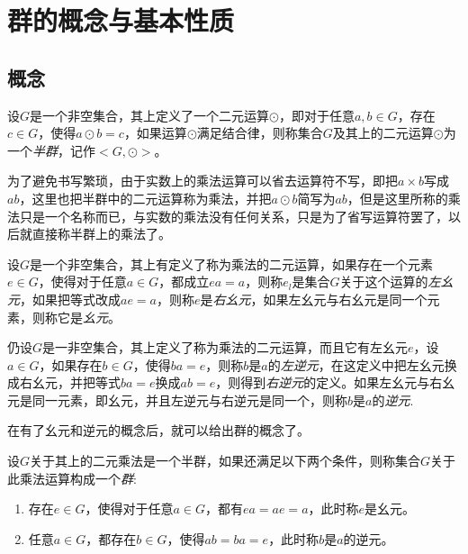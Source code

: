 
\section{群的概念与基本性质}
\label{sec:group}

\subsection{概念}
\label{sec:concept-of-group}



\begin{definition}
  设$G$是一个非空集合，其上定义了一个二元运算$\odot$，即对于任意$a,b \in G$，存在$c \in G$，使得$a\odot b=c$，如果运算$\odot$满足结合律，则称集合$G$及其上的二元运算$\odot$为一个\emph{半群}，记作$<G, \odot>$。
\end{definition}

为了避免书写繁琐，由于实数上的乘法运算可以省去运算符不写，即把$a\times b$写成$ab$，这里也把半群中的二元运算称为乘法，并把$a\odot b$简写为$ab$，但是这里所称的乘法只是一个名称而已，与实数的乘法没有任何关系，只是为了省写运算符罢了，以后就直接称半群上的乘法了。

\begin{definition}
  设$G$是一个非空集合，其上有定义了称为乘法的二元运算，如果存在一个元素$e \in G$，使得对于任意$a \in G$，都成立$ea=a$，则称$e_l$是集合$G$关于这个运算的\emph{左幺元}，如果把等式改成$ae=a$，则称$e$是\emph{右幺元}，如果左幺元与右幺元是同一个元素，则称它是\emph{幺元}。
\end{definition}

\begin{definition}
  仍设$G$是一非空集合，其上定义了称为乘法的二元运算，而且它有左幺元$e$，设$a \in G$，如果存在$b \in G$，使得$ba=e$，则称$b$是$a$的\emph{左逆元}，在这定义中把左幺元换成右幺元，并把等式$ba=e$换成$ab=e$，则得到\emph{右逆元}的定义。如果左幺元与右幺元是同一元素，即幺元，并且左逆元与右逆元是同一个，则称$b$是$a$的\emph{逆元}.
\end{definition}

在有了幺元和逆元的概念后，就可以给出群的概念了。

\begin{definition}
  设$G$关于其上的二元乘法是一个半群，如果还满足以下两个条件，则称集合$G$关于此乘法运算构成一个\emph{群}:
  \begin{enumerate}
  \item 存在$e \in G$，使得对于任意$a \in G$，都有$ea=ae=a$，此时称$e$是幺元。
  \item 任意$a \in G$，都存在$b \in G$，使得$ab=ba=e$，此时称$b$是$a$的逆元。
  \end{enumerate}
\end{definition}

